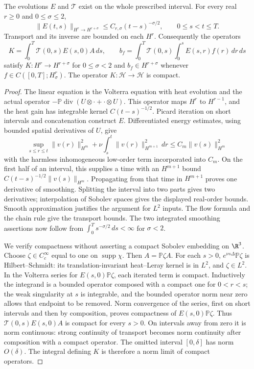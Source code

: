 \begin{lemma}\label{vf:smoothing}
The evolutions $E$ and $\mathcal T$ exist on the whole prescribed interval.
For every real $r\ge0$ and $0\le\sigma\le2$,
\[
 \|E(t,s)\|_{H^r\to H^{r+\sigma}}
 \le C_{r,\sigma}(t-s)^{-\sigma/2},\qquad 0\le s<t\le T.
\]
Transport and its inverse are bounded on each $H^r$.
Consequently the operators
\[
 K=\int_0^T\mathcal T(0,s)E(s,0)A\,ds,\qquad
 b_f=\int_0^T\mathcal T(0,s)\int_0^sE(s,r)f(r)\,dr\,ds
\]
satisfy $K:H^r\to H^{r+\sigma}$ for $0\le\sigma<2$ and
$b_f\in H^{r+\sigma}$ whenever $f\in C([0,T];H^r_\sigma)$.
The operator $K:\mathcal H\to\mathcal H$ is compact.
\end{lemma}
\begin{proof}
The linear equation is the Volterra equation with heat evolution and the
actual operator $-\mathbb P\operatorname{div}(U\otimes\cdot+
\cdot\otimes U)$. This operator maps $H^r$ to $H^{r-1}$, and the heat
gain has integrable kernel $C(t-s)^{-1/2}$. Picard iteration on short
intervals and concatenation construct $E$. Differentiated energy estimates,
using bounded spatial derivatives of $U$, give
\[
 \sup_{s\le r\le t}\|v(r)\|_{H^m}^2+
 \nu\int_s^t\|v(r)\|_{H^{m+1}}^2\,dr
 \le C_m\|v(s)\|_{H^m}^2
\]
with the harmless inhomogeneous low-order term incorporated into $C_m$.
On the first half of an interval, this supplies a time with an
$H^{m+1}$ bound $C(t-s)^{-1/2}\|v(s)\|_{H^m}$.
Propagating from that time in $H^{m+1}$ proves one derivative of smoothing.
Splitting the interval into two parts gives two derivatives; interpolation
of Sobolev spaces gives the displayed real-order bounds. Smooth
approximation justifies the argument for $L^2$ inputs.
The flow formula and the chain rule give the transport bounds.
The two integrated smoothing assertions now follow from
$\int_0^T s^{-\sigma/2}\,ds<\infty$ for $\sigma<2$.

We verify compactness without asserting a compact Sobolev embedding on
$\R^3$. Choose $\zeta\in C_c^\infty$ equal to one on
$\operatorname{supp}\chi$. Then $A=\mathbb P\zeta A$.
For each $s>0$, $e^{\nu s\Delta}\mathbb P\zeta$ is Hilbert--Schmidt:
its translation-invariant heat--Leray kernel is in $L^2$, and $\zeta\in L^2$.
In the Volterra series for $E(s,0)\mathbb P\zeta$, each iterated term
is compact. Inductively the integrand is a bounded operator composed with
a compact one for $0<r<s$; the weak singularity at $s$ is integrable,
and the bounded operator norm near zero allows that endpoint to be removed.
Norm convergence of the series, first on short intervals and then by
composition, proves compactness of $E(s,0)\mathbb P\zeta$.
Thus $\mathcal T(0,s)E(s,0)A$ is compact for every $s>0$.
On intervals away from zero it is norm continuous: strong continuity of
transport becomes norm continuity after composition with a compact operator.
The omitted interval $[0,\delta]$ has norm $O(\delta)$.
The integral defining $K$ is therefore a norm limit of compact operators.
\end{proof}

